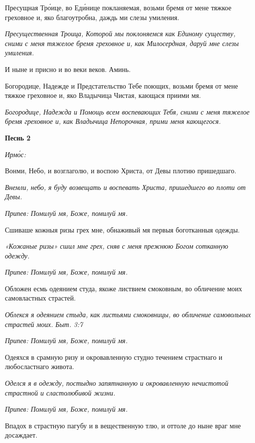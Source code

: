 Пресущная Тро́ице, во Еди́нице покланяемая, возьми бремя от мене тяжкое греховное и, яко благоутробна, даждь ми слезы умиления.


\itshape Пресущественная Троица, Которой мы поклоняемся как Единому существу, сними с меня тяжелое бремя греховное и, как Милосердная, даруй мне слезы умиления.\normalfont{}


И ныне и присно и во веки веков. Аминь.


Богородице, Надежде и Предстательство Тебе поющих, возьми бремя от мене тяжкое греховное и, яко Владычица Чистая, кающася приими мя.


\itshape Богородице, Надежда и Помощь всем воспевающих Тебя, сними с меня тяжелое бремя греховное и, как Владычица Непорочная, прими меня кающегося.\normalfont{}





\bfseries Песнь 2\normalfont{}


\itshape Ирмо́с:\normalfont{}


Вонми, Небо, и возглаголю, и воспою Христа, от Девы плотию пришедшаго.


\itshape Внемли, небо, я буду возвещать и воспевать Христа, пришедшего во плоти от Девы.\normalfont{}


\itshape Припев:\normalfont{} Помилуй мя, Боже, помилуй мя.


Сшиваше кожныя ризы грех мне, обнаживый мя первыя боготканныя одежды.


\itshape «Кожаные ризы» сшил мне грех, сняв с меня прежнюю Богом сотканную одежду.\normalfont{}


\itshape Припев:\normalfont{} Помилуй мя, Боже, помилуй мя.


Обложен есмь одеянием студа, якоже листвием смоковным, во обличение моих самовластных страстей.


\itshape Облекся я одеянием стыда, как листьями смоковницы, во обличение самовольных страстей моих. Быт. 3:7\normalfont{}


\itshape Припев:\normalfont{} Помилуй мя, Боже, помилуй мя.


Одеяхся в срамную ризу и окровавленную студно течением страстнаго и любосластнаго живота.


\itshape Оделся я в одежду, постыдно запятнанную и окровавленную нечистотой страстной и сластолюбивой жизни.\normalfont{}


\itshape Припев:\normalfont{} Помилуй мя, Боже, помилуй мя.


Впадох в страстную пагубу и в вещественную тлю, и оттоле до ныне враг мне досаждает.



